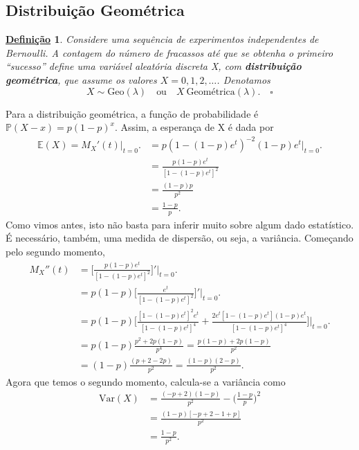 \documentclass{article}
\newtheorem*{def*}{\underline{Defini\c c\~ao}}
\begin{document}
\subsection{Distribuição Geométrica}
\begin{def*}
  Considere uma sequência de experimentos independentes de Bernoulli. A contagem do número de fracassos até que se obtenha o primeiro
  ``sucesso'' define uma variável aleatória discreta X, com \textbf{distribuição geométrica}, que assume os valores \(X = 0, 1, 2, \dotsc\). Denotamos 
  \[
    X\sim \mathrm{Geo}(\lambda )\quad \text{ou}\quad X~\text{Geométrica}(\lambda ).\quad\square
  \]
\end{def*}
Para a distribuição geométrica, a função de probabilidade é \(\mathbb{P}(X-x) = p(1-p)^{x}.\) Assim, a esperança de X é dada por 
\begin{align*}
  \mathbb{E}(X) = M_{X}'(t)\biggl|_{t=0}^{}\biggr. &= p(1-(1-p)e^{t})^{-2}(1-p)e^{t}\biggl|_{t=0}^{}\biggr.\\
                                                   &= \frac{p(1-p)e^{t}}{[1-(1-p)e^{t}]^{2}}\\
                                                   &=\frac{(1-p)p}{p^{2}}\\
                                                   &=\frac{1-p}{p}.
\end{align*}
Como vimos antes, isto não basta para inferir muito sobre algum dado estatístico. É necessário, também, uma medida de dispersão, ou seja, a variância.
Começando pelo segundo momento, 
\begin{align*}
  M_{X}''(t) &= \biggl[\frac{p(1-p)e^{t}}{[1-(1-p)e^{t}]^{2}}\biggr]'\biggl|_{t=0}^{}\biggr.\\
             &= p(1-p)\biggl[\frac{e^{t}}{[1-(1-p)e^{t}]^{2}}\biggr]'\biggl|_{t=0}^{}\biggr.\\
             &= p(1-p)\biggl[\frac{[1-(1-p)e^{t}]^{2}e^{t}}{[1-(1-p)e^{t}]^{4}} + \frac{2e^{t}[1-(1-p)e^{t}](1-p)e^{t}}{[1-(1-p)e^{t}]^{4}}\biggr]\biggl|_{t=0}^{}\biggr.\\
             &= p(1-p)\frac{p^{2}+2p(1-p)}{p^{4}} = \frac{p(1-p)+2p(1-p)}{p^{2}}\\
             &= (1-p)\frac{(p+2-2p)}{p^{2}} = \frac{(1-p)(2-p)}{p^{2}}.
\end{align*}
Agora que temos o segundo momento, calcula-se a variância como 
\begin{align*}
  \mathrm{Var}(X) &= \frac{(-p+2)(1-p)}{p^{2}} - \biggl(\frac{1-p}{p}\biggr)^{2}\\
                  &= \frac{(1-p)[-p+2-1+p]}{p^{2}}\\
                  &= \frac{1-p}{p^{2}}.
\end{align*}
\end{document}
